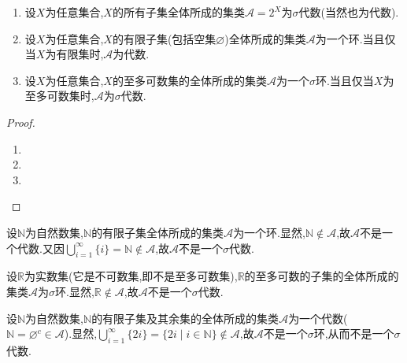 \documentclass[../../main.tex]{subfiles}%
\begin{document}
\begin{proposition}\label{proposition:集合论----环和代数的例子}
\begin{enumerate}[(1)]
\item\label{proposition:集合论----环和代数的例子-1} 设$X$为任意集合,$X$的所有子集全体所成的集类$\mathscr{A}=2^X$为$\sigma$代数(当然也为代数).

\item\label{proposition:集合论----环和代数的例子-2} 设$X$为任意集合,$X$的有限子集(包括空集$\varnothing$)全体所成的集类$\mathscr{A}$为一个环.当且仅当$X$为有限集时,$\mathscr{A}$为代数.

\item\label{proposition:集合论----环和代数的例子-3} 设$X$为任意集合,$X$的至多可数集的全体所成的集类$\mathscr{A}$为一个$\sigma$环.当且仅当$X$为至多可数集时,$\mathscr{A}$为$\sigma$代数.
\end{enumerate}
\end{proposition}
\begin{proof}
\begin{enumerate}[(1)]
\item 

\item 

\item 
\end{enumerate}

\end{proof}

\begin{example}\label{example:12213反例1}
设$\mathbb{N}$为自然数集,$\mathbb{N}$的有限子集全体所成的集类$\mathscr{A}$为一个环.显然,$\mathbb{N} \notin \mathscr{A}$,故$\mathscr{A}$不是一个代数.又因$\bigcup_{i=1}^{\infty} \{i\} = \mathbb{N} \notin \mathscr{A}$,故$\mathscr{A}$不是一个$\sigma$代数.
\end{example}

\begin{example}\label{example:12213反例2}
设$\mathbb{R}$为实数集(它是不可数集,即不是至多可数集),$\mathbb{R}$的至多可数的子集的全体所成的集类$\mathscr{A}$为$\sigma$环.显然,$\mathbb{R} \notin \mathscr{A}$,故$\mathscr{A}$不是一个$\sigma$代数.
\end{example}

\begin{example}\label{example:12213反例3}
设$\mathbb{N}$为自然数集,$\mathbb{N}$的有限子集及其余集的全体所成的集类$\mathscr{A}$为一个代数($\mathbb{N} = \varnothing^c \in \mathscr{A}$).显然,$\bigcup_{i=1}^{\infty} \{2i\} = \{2i \mid i \in \mathbb{N}\} \notin \mathscr{A}$,故$\mathscr{A}$不是一个$\sigma$环,从而不是一个$\sigma$代数.
\end{example}
\end{document}
